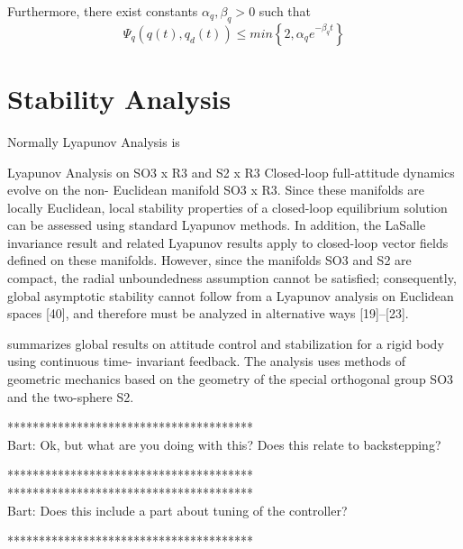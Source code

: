 Furthermore, there exist constants $ \alpha_q,\beta_q>0 $ such that
\begin{equation}\label{key}
\Psi_q(q(t),q_d(t)) \leq min\left\lbrace 2,\alpha_qe^{-\beta_qt}\right\rbrace 
\end{equation}

\section{Stability Analysis}\label{sec:con.sta}

Normally Lyapunov Analysis is 


Lyapunov Analysis on SO3 x R3 and S2 x R3
Closed-loop full-attitude dynamics evolve on the non- Euclidean manifold SO3 x R3. 
Since these manifolds are locally Euclidean, local stability properties of a closed-loop equilibrium solution can be assessed using standard Lyapunov methods. 
In addition, the LaSalle invariance result and related Lyapunov results apply to closed-loop vector fields defined on these manifolds. 
However, since the manifolds SO3 and S2 are compact, the radial unboundedness assumption cannot be satisfied; 
consequently, global asymptotic stability cannot follow from a Lyapunov analysis on Euclidean spaces [40], and therefore must be analyzed in alternative ways [19]–[23].\cite[p.43]{Chaturvedi2011}

\cite{Chaturvedi2011} summarizes global results on attitude control and stabilization for a rigid body using continuous time- invariant feedback. The analysis uses methods of geometric mechanics based on the geometry of the special orthogonal group SO3 and the two-sphere S2.


***************************************\\
Bart: Ok, but what are you doing with this? Does this relate to backstepping?

***************************************\\


***************************************\\
Bart: Does this include a part about tuning of the controller?

***************************************\\

